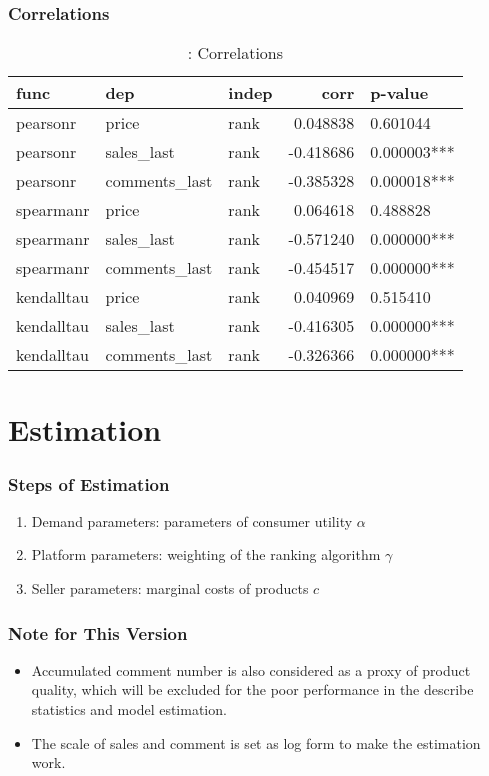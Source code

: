 \documentclass{beamer}
\begin{document}
\begin{frame}
\frametitle{Correlations}
\begin{table}[!hbp]
\centering
\begin{tabular}{lllrl}
       func &            dep & indep &      corr &      p-value \\
       \hline
   pearsonr &          price &  rank &  0.048838 &     0.601044 \\
   pearsonr &     sales\_last &  rank & -0.418686 &  0.000003*** \\
   pearsonr &  comments\_last &  rank & -0.385328 &  0.000018*** \\
  spearmanr &          price &  rank &  0.064618 &     0.488828 \\
  spearmanr &     sales\_last &  rank & -0.571240 &  0.000000*** \\
  spearmanr &  comments\_last &  rank & -0.454517 &  0.000000*** \\
 kendalltau &          price &  rank &  0.040969 &     0.515410 \\
 kendalltau &     sales\_last &  rank & -0.416305 &  0.000000*** \\
 kendalltau &  comments\_last &  rank & -0.326366 &  0.000000*** \\
\end{tabular}
\caption{\label{correlation}: Correlations}
\end{table}
\end{frame}

\section{Estimation}

\begin{frame}
\frametitle{Steps of Estimation}
\begin{enumerate}
\item Demand parameters: parameters of consumer utility $\alpha$
\item Platform parameters: weighting of the ranking algorithm $\gamma$
\item Seller parameters: marginal costs of products $c$
\end{enumerate}
\end{frame}

\begin{frame}
\frametitle{Note for This Version}
\begin{itemize}
\item Accumulated comment number is also considered as a proxy of product quality, which will be excluded for the poor performance in the describe statistics and model estimation.
\item The scale of sales and comment is set as log form to make the estimation work.
\end{itemize}
\end{frame}
\end{document}
